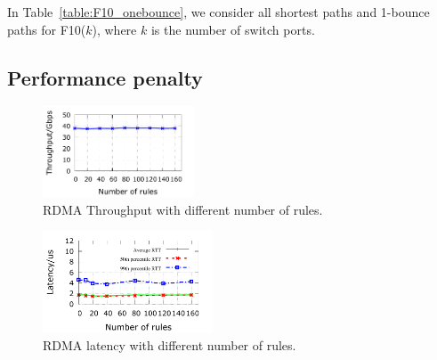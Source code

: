 \begin{table}[t]
	\centering
	\caption{F10 with shortest paths and 1-bounce paths.}
	\label{table:F10_onebounce}
\end{table}

In Table~\ref{table:F10_onebounce}, we consider all shortest paths and 1-bounce paths for F10($k$), where $k$ is the number of switch ports.

\subsection{Performance penalty}\label{subsec:exp_performanceoverhead}

\begin{figure}
	\centering
	\includegraphics[width=0.4\textwidth] {figs/overhead_avgthrpt}
	\caption{RDMA Throughput with different number of rules.}\label{fig:thrpt_overhead}
\end{figure}

\begin{figure}
	\centering
	\includegraphics[width=0.45\textwidth] {figs/RDMAlatency_overhead}
	\caption{RDMA latency with different number of rules.}\label{fig:latency_overhead}
\end{figure}

